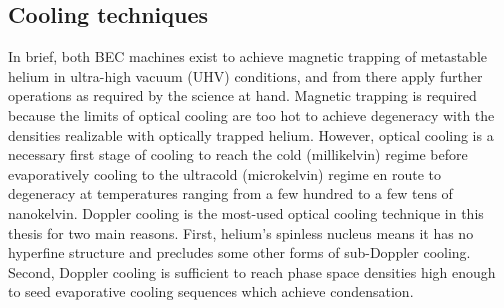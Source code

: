 \subsection{Cooling techniques}
	\label{sec:doppler_basics}
	In brief, both BEC machines exist to achieve magnetic trapping of metastable helium in ultra-high vacuum (UHV) conditions, and from there apply further operations as required by the science at hand.
	Magnetic trapping is required because the limits of optical cooling are too hot to achieve degeneracy with the densities realizable with optically trapped helium.
	However, optical cooling is a necessary first stage of cooling to reach the cold (millikelvin) regime before evaporatively cooling to the ultracold (microkelvin) regime en route to degeneracy at temperatures ranging from a few hundred to a few tens of nanokelvin.
	Doppler cooling is the most-used optical cooling technique in this thesis for two main reasons.
	First, helium's spinless nucleus means it has no hyperfine structure and precludes some other forms of sub-Doppler cooling.
	Second, Doppler cooling is sufficient to reach phase space densities high enough to seed evaporative cooling sequences which achieve condensation. 
	
